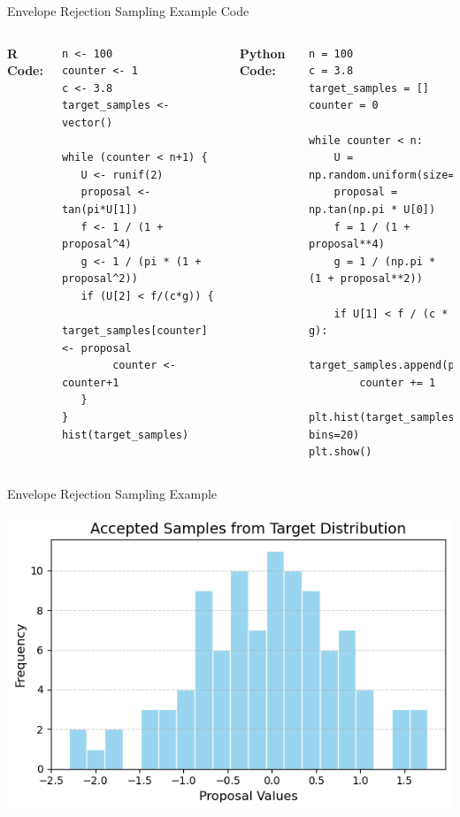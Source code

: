 \documentclass[8pt]{beamer}
\begin{document}
\begin{frame}[fragile]{Envelope Rejection Sampling Example}
\alert{Code}

\vspace{1mm}

\begin{columns}
{\bf R Code:}
\begin{lstlisting}
n <- 100
counter <- 1
c <- 3.8
target_samples <- vector()

while (counter < n+1) { 
   U <- runif(2)
   proposal <- tan(pi*U[1])
   f <- 1 / (1 + proposal^4)
   g <- 1 / (pi * (1 + proposal^2))
   if (U[2] < f/(c*g)) {
        target_samples[counter] <- proposal
        counter <- counter+1
   }
}
hist(target_samples)
\end{lstlisting}

{\bf Python Code:}
\begin{lstlisting}
n = 100
c = 3.8
target_samples = []
counter = 0

while counter < n:
    U = np.random.uniform(size=2)
    proposal = np.tan(np.pi * U[0])
    f = 1 / (1 + proposal**4)
    g = 1 / (np.pi * (1 + proposal**2))
    
    if U[1] < f / (c * g):
        target_samples.append(proposal)
        counter += 1

plt.hist(target_samples, bins=20)
plt.show()
\end{lstlisting}
\end{columns}
\end{frame}

\begin{frame}[fragile]{Envelope Rejection Sampling Example}
\begin{center}
\includegraphics[scale=0.6]{chapter1-part3-plot4.png}
\end{center}
\end{frame}
\end{document}
